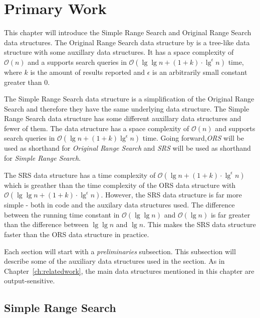 \chapter{Primary Work}
\label{ch:primarywork}


This chapter will introduce the Simple Range Search and Original Range Search data structures. The Original Range Search data structure by \citet{chanetal} is a tree-like data structure with some auxillary data structures. It has a space complexity of $\mathcal{O}(n)$ and a supports search queries in $\mathcal{O}(\lg\lg n + (1+k)\cdot\lg^\epsilon n)$ time, where $k$ is the amount of results reported and $\epsilon$ is an arbitrarily small constant greater than $0$.

The Simple Range Search data structure is a simplification of the Original Range Search and therefore they have the same underlying data structure. The Simple Range Search data structure has some different auxillary data structures and fewer of them. The data structure has a space complexity of $\mathcal{O}(n)$ and supports search queries in $\mathcal{O}(\lg n + (1+k)\lg^\epsilon n)$ time. Going forward,\emph{ORS} will be used as shorthand for \emph{Original Range Search} and \emph{SRS} will be used as shorthand for \emph{Simple Range Search}.


The SRS data structure has a time complexity of $\mathcal{O}(\lg n + (1+k)\cdot \lg^\epsilon n)$ which is greather than the time complexity of the ORS data structure with $\mathcal{O}(\lg \lg n + (1+k)\cdot \lg^\epsilon n)$. However, the SRS data structure is far more simple - both in code and the auxilary data structures used. The difference between the running time constant in $\mathcal{O}(\lg \lg n)$ and $\mathcal{O}(\lg n)$ is far greater than the difference between $\lg \lg n$ and $\lg n$. This makes the SRS data structure faster than the ORS data structure in practice.

\vspace{4mm}

Each section will start with a \emph{preliminaries} subsection. This subsection will describe some of the auxiliary data structures used in the section. As in Chapter~\ref{ch:relatedwork}, the main data structures mentioned in this chapter are output-sensitive.

\section{Simple Range Search}
\label{sect:simple}

